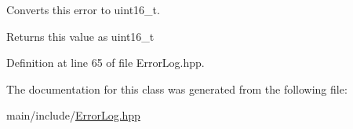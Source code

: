 Converts this error to uint16\+\_\+t.

\begin{DoxyReturn}{Returns}
this value as uint16\+\_\+t 
\end{DoxyReturn}


Definition at line 65 of file Error\+Log.\+hpp.


\begin{DoxyCode}{0}

\end{DoxyCode}


The documentation for this class was generated from the following file\+:\begin{DoxyCompactItemize}
\item 
main/include/\mbox{\hyperlink{ErrorLog_8hpp}{Error\+Log.\+hpp}}\end{DoxyCompactItemize}
